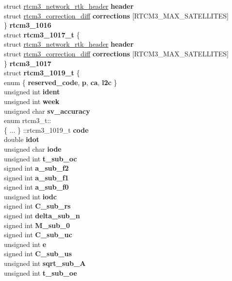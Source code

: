 \begin{DoxyCompactItemize}
{\begin{tabbing}
\>\>struct \hyperlink{structrtcm3__network__rtk__header}{rtcm3\_network\_rtk\_header} {\bfseries header}\\
\>\>struct \hyperlink{structrtcm3__correction__diff}{rtcm3\_correction\_diff} {\bfseries corrections} \mbox{[}RTCM3\_MAX\_SATELLITES\mbox{]}\\
\>\} {\bfseries rtcm3\_1016}\\
\>struct {\bfseries rtcm3\_1017\_t} \{\\
\>\>struct \hyperlink{structrtcm3__network__rtk__header}{rtcm3\_network\_rtk\_header} {\bfseries header}\\
\>\>struct \hyperlink{structrtcm3__correction__diff}{rtcm3\_correction\_diff} {\bfseries corrections} \mbox{[}RTCM3\_MAX\_SATELLITES\mbox{]}\\
\>\} {\bfseries rtcm3\_1017}\\
\>struct {\bfseries rtcm3\_1019\_t} \{\\
enum \{ {\bfseries reserved\_code}, 
{\bfseries p}, 
{\bfseries ca}, 
{\bfseries l2c}
 \}\\
\>\>unsigned int {\bfseries ident}\\
\>\>unsigned int {\bfseries week}\\
\>\>unsigned char {\bfseries sv\_accuracy}\\
\>\>enum rtcm3\_t:: \\
\{ ... \} ::rtcm3\_1019\_t {\bfseries code}\\
\>\>double {\bfseries idot}\\
\>\>unsigned char {\bfseries iode}\\
\>\>unsigned int {\bfseries t\_sub\_oc}\\
\>\>signed int {\bfseries a\_sub\_f2}\\
\>\>signed int {\bfseries a\_sub\_f1}\\
\>\>signed int {\bfseries a\_sub\_f0}\\
\>\>unsigned int {\bfseries iodc}\\
\>\>signed int {\bfseries C\_sub\_rs}\\
\>\>signed int {\bfseries delta\_sub\_n}\\
\>\>signed int {\bfseries M\_sub\_0}\\
\>\>signed int {\bfseries C\_sub\_uc}\\
\>\>unsigned int {\bfseries e}\\
\>\>signed int {\bfseries C\_sub\_us}\\
\>\>unsigned int {\bfseries sqrt\_sub\_A}\\
\>\>unsigned int {\bfseries t\_sub\_oe}\\

\end{tabbing}}
\end{DoxyCompactItemize}
